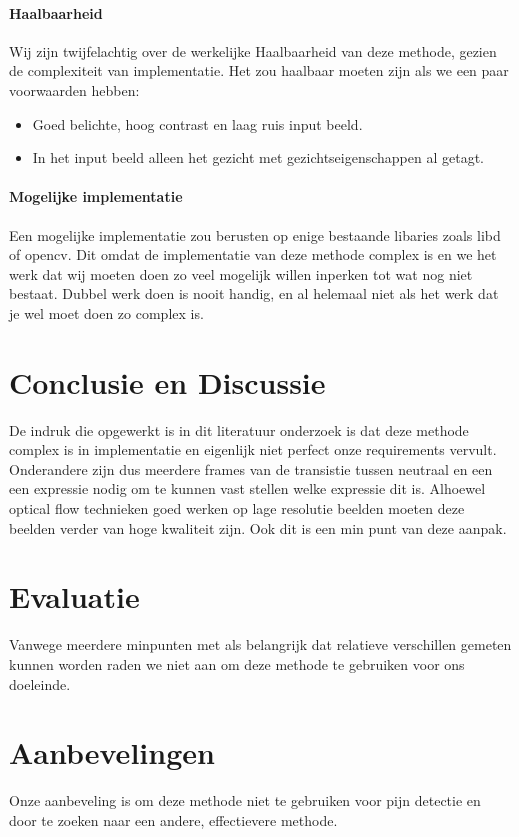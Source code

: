 \documentclass[11pt]{article}
\begin{document}
    \paragraph{Haalbaarheid}
    Wij zijn twijfelachtig over de werkelijke Haalbaarheid van deze methode, gezien de complexiteit van implementatie.
    Het zou haalbaar moeten zijn als we een paar voorwaarden hebben:
    \begin{itemize}
        \item Goed belichte, hoog contrast en laag ruis input beeld.
        \item In het input beeld alleen het gezicht met gezichtseigenschappen al getagt.
    \end{itemize}

    \paragraph{Mogelijke implementatie}
    Een mogelijke implementatie zou berusten op enige bestaande libaries zoals libd of opencv.
    Dit omdat de implementatie van deze methode complex is en we het werk dat wij moeten doen zo veel mogelijk willen inperken tot wat nog niet bestaat.
    Dubbel werk doen is nooit handig, en al helemaal niet als het werk dat je wel moet doen zo complex is.

    \section{Conclusie en Discussie}
    De indruk die opgewerkt is in dit literatuur onderzoek is dat deze methode complex is in implementatie en eigenlijk niet perfect onze requirements vervult.
    Onderandere zijn dus meerdere frames van de transistie tussen neutraal en een een expressie nodig om te kunnen vast stellen welke expressie dit is.
    Alhoewel optical flow technieken goed werken op lage resolutie beelden moeten deze beelden verder van hoge kwaliteit zijn.
    Ook dit is een min punt van deze aanpak.

    \section{Evaluatie}
    Vanwege meerdere minpunten met als belangrijk dat relatieve verschillen gemeten kunnen worden raden we niet aan om deze methode te gebruiken voor ons doeleinde.

    \section{Aanbevelingen}
    Onze aanbeveling is om deze methode niet te gebruiken voor pijn detectie en door te zoeken naar een andere, effectievere methode.
\end{document}
